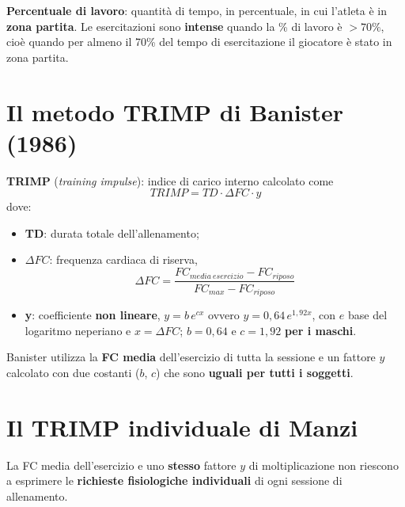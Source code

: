 \textbf{Percentuale di lavoro}: quantità di tempo, in percentuale, in cui l'atleta è in
\textbf{zona partita}. Le esercitazioni sono \textbf{intense} quando la \% di lavoro è
$>70\%$, cioè quando per almeno il 70\% del tempo di esercitazione il giocatore è stato in zona
partita.

\section{Il metodo TRIMP di Banister (1986)}

\textbf{TRIMP} (\textit{training impulse}): indice di carico interno calcolato come
\[ TRIMP = TD \cdot \Delta FC \cdot y \]
dove:
\begin{itemize}
  \item \textbf{TD}: durata totale dell'allenamento;
  \item \textbf{$\Delta FC$}: frequenza cardiaca di riserva,
    \[ \Delta FC = \frac{FC_{media\ esercizio} - FC_{riposo}}{FC_{max} - FC_{riposo}} \]
  \item \textbf{y}: coefficiente \textbf{non lineare}, $y = b\,e^{cx}$ ovvero
    $y = 0{,}64\,e^{1{,}92x}$, con $e$ base del logaritmo neperiano e $x = \Delta FC$;
    $b = 0{,}64$ e $c = 1{,}92$ \textbf{per i maschi}.
\end{itemize}

Banister utilizza la \textbf{FC media} dell'esercizio di tutta la sessione e un fattore $y$
calcolato con due costanti ($b$, $c$) che sono \textbf{uguali per tutti i soggetti}.

\section{Il TRIMP individuale di Manzi}

La FC media dell'esercizio e uno \textbf{stesso} fattore $y$ di moltiplicazione non riescono a
esprimere le \textbf{richieste fisiologiche individuali} di ogni sessione di allenamento.

